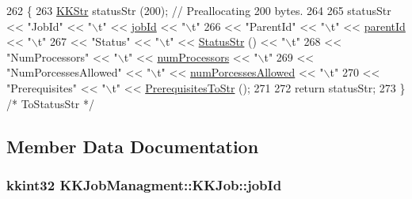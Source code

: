 \begin{DoxyCode}
262 \{
263   \hyperlink{class_k_k_b_1_1_k_k_str}{KKStr}  statusStr (200);  \textcolor{comment}{// Preallocating 200 bytes.}
264 
265   statusStr << \textcolor{stringliteral}{"JobId"}                << \textcolor{stringliteral}{"\(\backslash\)t"} << \hyperlink{class_k_k_job_managment_1_1_k_k_job_a655535952219853be0aea068e60c974b}{jobId}                << \textcolor{stringliteral}{"\(\backslash\)t"}
266             << \textcolor{stringliteral}{"ParentId"}             << \textcolor{stringliteral}{"\(\backslash\)t"} << \hyperlink{class_k_k_job_managment_1_1_k_k_job_a2623203d948d2e6348f7edc572e6abb4}{parentId}             << \textcolor{stringliteral}{"\(\backslash\)t"}
267             << \textcolor{stringliteral}{"Status"}               << \textcolor{stringliteral}{"\(\backslash\)t"} << \hyperlink{class_k_k_job_managment_1_1_k_k_job_a203c289689cede5da9e838c51bd8bed9}{StatusStr} ()         << \textcolor{stringliteral}{"\(\backslash\)t"}
268             << \textcolor{stringliteral}{"NumProcessors"}        << \textcolor{stringliteral}{"\(\backslash\)t"} << \hyperlink{class_k_k_job_managment_1_1_k_k_job_a828964b409f07218424024e972d7d4ef}{numProcessors}        << \textcolor{stringliteral}{"\(\backslash\)t"}
269             << \textcolor{stringliteral}{"NumPorcessesAllowed"}  << \textcolor{stringliteral}{"\(\backslash\)t"} << \hyperlink{class_k_k_job_managment_1_1_k_k_job_aac8edcaac05b4e6f9511a3f1dff7e0a8}{numPorcessesAllowed}  << \textcolor{stringliteral}{"\(\backslash\)t"}
270             << \textcolor{stringliteral}{"Prerequisites"}        << \textcolor{stringliteral}{"\(\backslash\)t"} << \hyperlink{class_k_k_job_managment_1_1_k_k_job_af7710445d08d9b8898bb239923baa2c6}{PrerequisitesToStr} ();
271 
272   \textcolor{keywordflow}{return}  statusStr;
273 \}  \textcolor{comment}{/* ToStatusStr */}
\end{DoxyCode}


\subsection{Member Data Documentation}
\subsubsection[{\texorpdfstring{job\+Id}{jobId}}]{\setlength{\rightskip}{0pt plus 5cm}kkint32 K\+K\+Job\+Managment\+::\+K\+K\+Job\+::job\+Id\hspace{0.3cm}{\ttfamily [protected]}}\hypertarget{class_k_k_job_managment_1_1_k_k_job_a655535952219853be0aea068e60c974b}{}\label{class_k_k_job_managment_1_1_k_k_job_a655535952219853be0aea068e60c974b}


